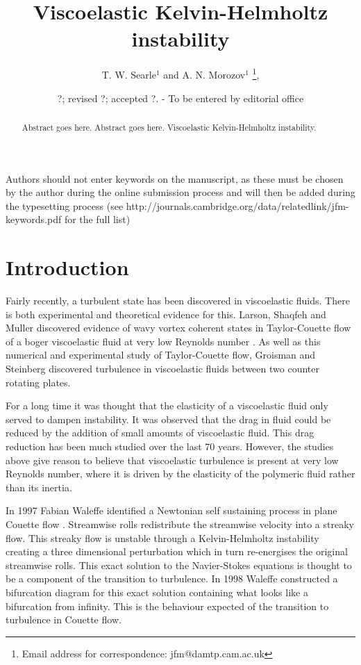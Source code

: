 \documentclass{jfm}
\title[Viscoelastic Kelvin-Helmholtz instabilty]{Viscoelastic Kelvin-Helmholtz instability}
\author[T. W. Searle and A. N. Morozov]%
{T. W. Searle$^1$ and A. N. Morozov$^1$%
  \thanks{Email address for correspondence: jfm@damtp.cam.ac.uk},\ns
}
\affiliation{$^1$SUPA, School of Physics and Astronomy, University of Edinburgh, Mayfield Road,
Edinburgh, EH9 3JZ, UK\\[\affilskip]
}
\date{?; revised ?; accepted ?. - To be entered by editorial office}
\begin{document}
\maketitle

\begin{abstract}
  Abstract goes here. Abstract goes here. Viscoelastic Kelvin-Helmholtz instability. 
\end{abstract}

\begin{keywords}
Authors should not enter keywords on the manuscript, as these must be chosen by the author during the online submission process and will then be added during the typesetting process (see http://journals.cambridge.org/data/\linebreak[3]relatedlink/jfm-\linebreak[3]keywords.pdf for the full list)
\end{keywords}

\section{Introduction}

Fairly recently, a turbulent state has been discovered in viscoelastic fluids. There is both experimental and theoretical evidence for this. Larson, Shaqfeh and Muller discovered evidence of wavy vortex coherent states in Taylor-Couette flow of a boger viscoelastic fluid at very low Reynolds number \cite{Larson1990}. As well as this numerical and experimental study of Taylor-Couette flow, Groisman and Steinberg \cite{Groisman2000} discovered turbulence in viscoelastic fluids between two counter rotating plates.

For a long time it was thought that the elasticity of a viscoelastic fluid only served to dampen instability. It was observed that the drag in fluid could be reduced by the addition of small amounts of viscoelastic fluid. This drag reduction has been much studied over the last 70 years. However, the studies above give reason to believe that viscoelastic turbulence is present at very low Reynolds number, where it is driven by the elasticity of the polymeric fluid rather than its inertia.

In 1997 Fabian Waleffe identified a Newtonian self sustaining process in plane Couette flow \cite{Waleffe97}. Streamwise rolls redistribute the streamwise velocity into a streaky flow. This streaky flow is unstable through a Kelvin-Helmholtz instability creating a three dimensional perturbation which in turn re-energises the original streamwise rolls. This exact solution to the Navier-Stokes equations is thought to be a component of the transition to turbulence. In 1998 Waleffe constructed a bifurcation diagram for this exact solution \cite{Waleffe98} containing what looks like a bifurcation from infinity. This is the behaviour expected of the transition to turbulence in Couette flow.
\end{document}
